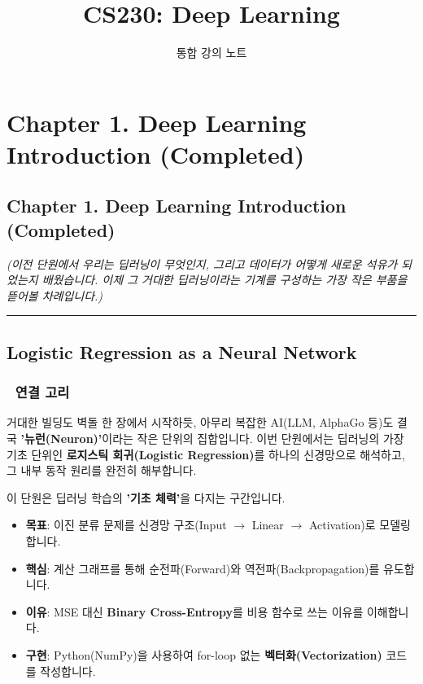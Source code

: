 \documentclass[11pt,a4paper]{book}
\title{\textbf{CS230: Deep Learning}}
\author{통합 강의 노트}
\date{}
\theoremstyle{definition}
\begin{document}
\maketitle
\tableofcontents


\chapter{Chapter 1. Deep Learning Introduction (Completed)}
\label{ch:lecture1}



\section*{Chapter 1. Deep Learning Introduction (Completed)}
\textit{(이전 단원에서 우리는 딥러닝이 무엇인지, 그리고 데이터가 어떻게 새로운 석유가 되었는지 배웠습니다. 이제 그 거대한 딥러닝이라는 기계를 구성하는 가장 작은 부품을 뜯어볼 차례입니다.)}

\vspace{1cm}
\hrule
\vspace{1cm}

\section{Logistic Regression as a Neural Network}

\subsection*{🔗 연결 고리}
거대한 빌딩도 벽돌 한 장에서 시작하듯, 아무리 복잡한 AI(LLM, AlphaGo 등)도 결국 \textbf{'뉴런(Neuron)'}이라는 작은 단위의 집합입니다. 이번 단원에서는 딥러닝의 가장 기초 단위인 \textbf{로지스틱 회귀(Logistic Regression)}를 하나의 신경망으로 해석하고, 그 내부 동작 원리를 완전히 해부합니다.

\begin{summarybox}[title={📌 단원 개요 (Overview)}]
이 단원은 딥러닝 학습의 \textbf{'기초 체력'}을 다지는 구간입니다.
\begin{itemize}
    \item \textbf{목표}: 이진 분류 문제를 신경망 구조(Input $\to$ Linear $\to$ Activation)로 모델링합니다.
    \item \textbf{핵심}: 계산 그래프를 통해 순전파(Forward)와 역전파(Backpropagation)를 유도합니다.
    \item \textbf{이유}: MSE 대신 \textbf{Binary Cross-Entropy}를 비용 함수로 쓰는 이유를 이해합니다.
    \item \textbf{구현}: Python(NumPy)을 사용하여 for-loop 없는 \textbf{벡터화(Vectorization)} 코드를 작성합니다.
\end{itemize}
\end{summarybox}
\end{document}

